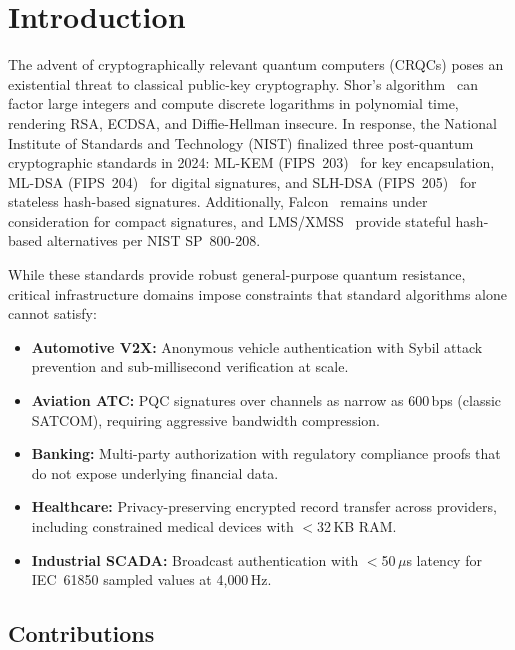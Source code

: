\documentclass[conference,10pt]{IEEEtran}
\begin{document}
\section{Introduction}
\label{sec:intro}

The advent of cryptographically relevant quantum computers (CRQCs) poses an existential threat to classical public-key cryptography. Shor's algorithm~\cite{shor1997} can factor large integers and compute discrete logarithms in polynomial time, rendering RSA, ECDSA, and Diffie-Hellman insecure. In response, the National Institute of Standards and Technology (NIST) finalized three post-quantum cryptographic standards in 2024: ML-KEM (FIPS~203)~\cite{fips203} for key encapsulation, ML-DSA (FIPS~204)~\cite{fips204} for digital signatures, and SLH-DSA (FIPS~205)~\cite{fips205} for stateless hash-based signatures. Additionally, Falcon~\cite{falcon} remains under consideration for compact signatures, and LMS/XMSS~\cite{sp800208} provide stateful hash-based alternatives per NIST SP~800-208.

While these standards provide robust general-purpose quantum resistance, critical infrastructure domains impose constraints that standard algorithms alone cannot satisfy:

\begin{itemize}
    \item \textbf{Automotive V2X:} Anonymous vehicle authentication with Sybil attack prevention and sub-millisecond verification at scale.
    \item \textbf{Aviation ATC:} PQC signatures over channels as narrow as 600\,bps (classic SATCOM), requiring aggressive bandwidth compression.
    \item \textbf{Banking:} Multi-party authorization with regulatory compliance proofs that do not expose underlying financial data.
    \item \textbf{Healthcare:} Privacy-preserving encrypted record transfer across providers, including constrained medical devices with $<$32\,KB RAM.
    \item \textbf{Industrial SCADA:} Broadcast authentication with $<$50\,$\mu$s latency for IEC~61850 sampled values at 4{,}000\,Hz.
\end{itemize}

\subsection{Contributions}
\end{document}
